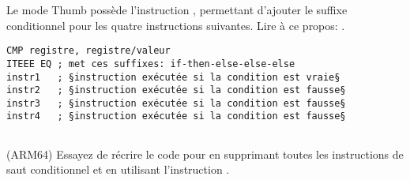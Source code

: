 
Le mode Thumb possède l'instruction , permettant d'ajouter le suffixe conditionnel
pour les quatre instructions suivantes.
Lire à ce propos: .

\begin{lstlisting}[caption=ARM (\ThumbMode),style=customasmARM]
CMP registre, registre/valeur
ITEEE EQ ; met ces suffixes: if-then-else-else-else
instr1   ; §instruction exécutée si la condition est vraie§
instr2   ; §instruction exécutée si la condition est fausse§
instr3   ; §instruction exécutée si la condition est fausse§
instr4   ; §instruction exécutée si la condition est fausse§
\end{lstlisting}

\subsection{\Exercise}

(ARM64) Essayez de récrire le code pour  en supprimant toutes
les instructions de saut conditionnel et en utilisant l'instruction .

